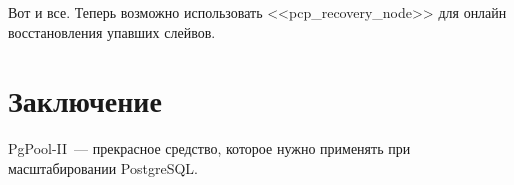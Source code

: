 
Вот и все. Теперь возможно использовать <<pcp\_recovery\_node>> для онлайн восстановления упавших слейвов.


\section{Заключение}
PgPool-II~--- прекрасное средство, которое нужно применять при масштабировании PostgreSQL.

